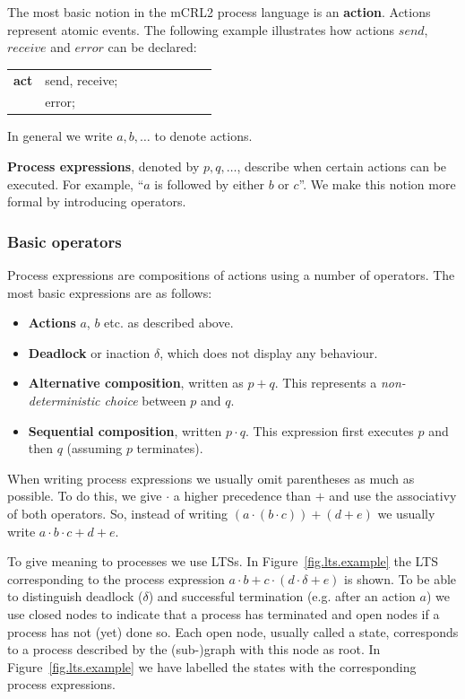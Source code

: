 \documentclass[a4paper,fleqn]{article}
\makeatletter
\newcommand{\f}[1]{\ensuremath{\mathit{#1}}}
\newcommand{\deffont}[1]{\textbf{#1}}
\newcommand{\seq}{\mathbin{\cdot}}
\newcommand{\alt}{\mathbin{+}}
\newenvironment{mcrl2}%
{\par\bigskip\noindent%
 \begin{tabular}{@{}>{\bf}p{2.3em}L@{\ }L@{\ }L@{\ }L@{\ }L@{\ }L@{\ }L@{\ }L}%
}%
{\end{tabular}\bigskip\par%
}
\makeatother
\begin{document}
The most basic notion in the mCRL2 process language is an \deffont{action}.
Actions represent atomic events. The following example illustrates how actions
$\f{send}$, $\f{receive}$ and $\f{error}$ can be declared:
\begin{mcrl2}
act & send, receive;\\
    & error;
\end{mcrl2}

\noindent
In general we write $a,b,\ldots$ to denote actions.

\deffont{Process expressions}, denoted by $p,q,\ldots$, describe when certain
actions can be executed. For example, ``$a$ is followed by either $b$ or $c$''. We
make this notion more formal by introducing operators.

\subsubsection{Basic operators}
\label{ssec:basic operators}

\noindent
Process expressions are compositions of actions using a number of operators.
The most basic expressions are as follows:
\begin{itemize}
\item \deffont{Actions} $a$, $b$ etc. as described above.

\item \deffont{Deadlock} or inaction $\delta$, which does not display any
behaviour.

\item \deffont{Alternative composition}, written as $p \alt q$. This
represents a \emph{non-deterministic choice} between $p$ and $q$.

\item \deffont{Sequential composition}, written $p \seq q$. This expression
first executes $p$ and then $q$ (assuming $p$ terminates).
\end{itemize}

\noindent
When writing process expressions we usually omit parentheses as much as
possible. To do this, we give $\seq$ a higher precedence than $\alt$ and use
the associativy of both operators. So, instead of writing $(a\seq (b\seq
c))\alt(d\alt e)$ we usually write $a\seq b\seq c\alt d\alt e$.

To give meaning to processes we use LTSs. In Figure~\ref{fig.lts.example} the
LTS corresponding to the process expression $a\seq b\alt c\seq(d\seq\delta\alt
e)$ is shown. To be able to distinguish deadlock ($\delta$) and successful
termination (e.g. after an action $a$) we use closed nodes to indicate that a
process has terminated and open nodes if a process has not (yet) done so. Each
open node, usually called a state, corresponds to a process described by the
(sub-)graph with this node as root. In Figure~\ref{fig.lts.example} we have
labelled the states with the corresponding process expressions.
\end{document}
